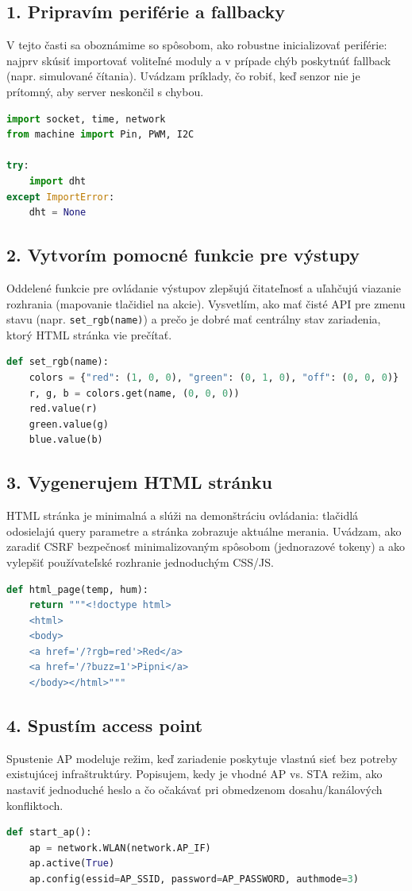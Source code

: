 \subsection*{1. Pripravím periférie a fallbacky}
V tejto časti sa oboznámime so spôsobom, ako robustne inicializovať periférie: najprv skúsiť importovať voliteľné moduly a v prípade chýb poskytnúť fallback (napr. simulované čítania). Uvádzam príklady, čo robiť, keď senzor nie je prítomný, aby server neskončil s chybou.
\begin{lstlisting}[language=Python]
import socket, time, network
from machine import Pin, PWM, I2C

try:
	import dht
except ImportError:
	dht = None
\end{lstlisting}

\subsection*{2. Vytvorím pomocné funkcie pre výstupy}
	Oddelené funkcie pre ovládanie výstupov zlepšujú čitateľnosť a uľahčujú viazanie rozhrania (mapovanie tlačidiel na akcie). Vysvetlím, ako mať čisté API pre zmenu stavu (napr. \lstinline|set_rgb(name)|) a prečo je dobré mať centrálny stav zariadenia, ktorý HTML stránka vie prečítať.
\begin{lstlisting}[language=Python]
def set_rgb(name):
	colors = {"red": (1, 0, 0), "green": (0, 1, 0), "off": (0, 0, 0)}
	r, g, b = colors.get(name, (0, 0, 0))
	red.value(r)
	green.value(g)
	blue.value(b)
\end{lstlisting}

\subsection*{3. Vygenerujem HTML stránku}
HTML stránka je minimalná a slúži na demonštráciu ovládania: tlačidlá odosielajú query parametre a stránka zobrazuje aktuálne merania. Uvádzam, ako zaradiť CSRF bezpečnosť minimalizovaným spôsobom (jednorazové tokeny) a ako vylepšiť používateľské rozhranie jednoduchým CSS/JS.
\begin{lstlisting}[language=Python]
def html_page(temp, hum):
	return """<!doctype html>
	<html>
	<body>
	<a href='/?rgb=red'>Red</a>
	<a href='/?buzz=1'>Pipni</a>
	</body></html>"""
\end{lstlisting}

\subsection*{4. Spustím access point}
Spustenie AP modeluje režim, keď zariadenie poskytuje vlastnú sieť bez potreby existujúcej infraštruktúry. Popisujem, kedy je vhodné AP vs. STA režim, ako nastaviť jednoduché heslo a čo očakávať pri obmedzenom dosahu/kanálových konfliktoch.
\begin{lstlisting}[language=Python]
def start_ap():
	ap = network.WLAN(network.AP_IF)
	ap.active(True)
	ap.config(essid=AP_SSID, password=AP_PASSWORD, authmode=3)
\end{lstlisting}


